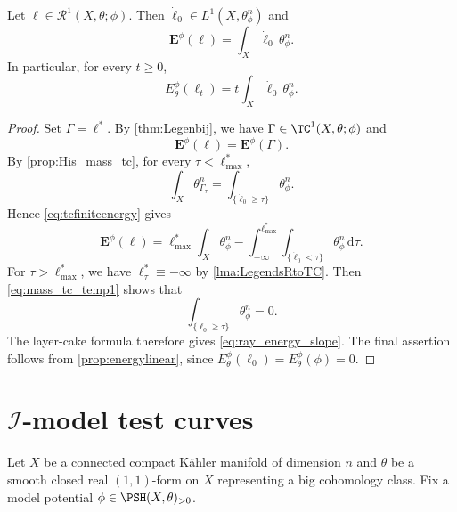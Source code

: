 \begin{corollary}\label{cor:ray_energy_slope}
    Let $\ell\in \mathcal{R}^1(X,\theta;\phi)$. Then $\dot{\ell}_0\in L^1(X,\theta_{\phi}^n)$ and
    \begin{equation}\label{eq:ray_energy_slope}
        \mathbf{E}^{\phi}(\ell)=\int_X \dot{\ell}_0\,\theta_{\phi}^n.
    \end{equation}
    In particular, for every $t\geq 0$,
    \[
        E_{\theta}^{\phi}(\ell_t)=t\int_X \dot{\ell}_0\,\theta_{\phi}^n.
    \]
\end{corollary}
\begin{proof}
    Set $\Gamma=\ell^*$. By \cref{thm:Legenbij}, we have $\Gamma\in \TC^1(X,\theta;\phi)$ and
    \[
        \mathbf{E}^{\phi}(\ell)=\mathbf{E}^{\phi}(\Gamma).
    \]
    By \cref{prop:His_mass_tc}, for every $\tau<\ell^*_{\max}$,
    \[
        \int_X \theta_{\Gamma_{\tau}}^n=\int_{\{\dot{\ell}_0\geq \tau\}} \theta_{\phi}^n.
    \]
    Hence \eqref{eq:tcfiniteenergy} gives
    \[
        \mathbf{E}^{\phi}(\ell)
        =\ell^*_{\max}\int_X \theta_{\phi}^n-\int_{-\infty}^{\ell^*_{\max}} \int_{\{\dot{\ell}_0<\tau\}}\theta_{\phi}^n\,\mathrm{d}\tau.
    \]
    For $\tau>\ell^*_{\max}$, we have $\ell^*_{\tau}\equiv -\infty$ by \cref{lma:LegendsRtoTC}. Then \eqref{eq:mass_tc_temp1} shows that 
    \[
        \int_{\{\dot{\ell}_0\geq \tau\}}\theta_{\phi}^n=0.
    \]
    The layer-cake formula therefore gives \eqref{eq:ray_energy_slope}. The final assertion follows from \cref{prop:energylinear}, since $E_{\theta}^{\phi}(\ell_0)=E_{\theta}^{\phi}(\phi)=0$.
\end{proof}



\section{\texorpdfstring{$\mathcal{I}$}{I}-model test curves}\label{sec:Imodeltc}
Let $X$ be a connected compact K\"ahler manifold of dimension $n$ and $\theta$ be a smooth closed real $(1,1)$-form on $X$ representing a big cohomology class.
Fix a model potential $\phi\in \PSH(X,\theta)_{>0}$.


